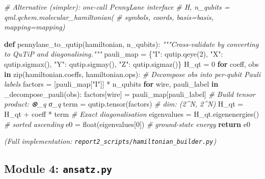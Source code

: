 \documentclass[
  11pt,
]{report}
\newenvironment{Shaded}{}{}
\newcommand{\BuiltInTok}[1]{\textcolor[rgb]{0.00,0.50,0.00}{#1}}
\newcommand{\CommentTok}[1]{\textcolor[rgb]{0.38,0.63,0.69}{\textit{#1}}}
\newcommand{\ControlFlowTok}[1]{\textcolor[rgb]{0.00,0.44,0.13}{\textbf{#1}}}
\newcommand{\DecValTok}[1]{\textcolor[rgb]{0.25,0.63,0.44}{#1}}
\newcommand{\KeywordTok}[1]{\textcolor[rgb]{0.00,0.44,0.13}{\textbf{#1}}}
\newcommand{\NormalTok}[1]{#1}
\newcommand{\OperatorTok}[1]{\textcolor[rgb]{0.40,0.40,0.40}{#1}}
\newcommand{\StringTok}[1]{\textcolor[rgb]{0.25,0.44,0.63}{#1}}
\begin{document}
\begin{Shaded}
\begin{Highlighting}[]
    \CommentTok{\# Alternative (simpler): one{-}call PennyLane interface}
    \CommentTok{\# H, n\_qubits = qml.qchem.molecular\_hamiltonian(}
    \CommentTok{\#     symbols, coords, basis=basis, mapping=mapping)}


\KeywordTok{def}\NormalTok{ pennylane\_to\_qutip(hamiltonian, n\_qubits):}
    \CommentTok{"""Cross{-}validate by converting to QuTiP and diagonalising."""}
\NormalTok{    pauli\_map }\OperatorTok{=}\NormalTok{ \{}\StringTok{"I"}\NormalTok{: qutip.qeye(}\DecValTok{2}\NormalTok{), }\StringTok{"X"}\NormalTok{: qutip.sigmax(),}
                 \StringTok{"Y"}\NormalTok{: qutip.sigmay(), }\StringTok{"Z"}\NormalTok{: qutip.sigmaz()\}}
\NormalTok{    H\_qt }\OperatorTok{=} \DecValTok{0}
    \ControlFlowTok{for}\NormalTok{ coeff, obs }\KeywordTok{in} \BuiltInTok{zip}\NormalTok{(hamiltonian.coeffs, hamiltonian.ops):}
        \CommentTok{\# Decompose obs into per{-}qubit Pauli labels}
\NormalTok{        factors }\OperatorTok{=}\NormalTok{ [pauli\_map[}\StringTok{"I"}\NormalTok{]] }\OperatorTok{*}\NormalTok{ n\_qubits}
        \ControlFlowTok{for}\NormalTok{ wire, pauli\_label }\KeywordTok{in}\NormalTok{ \_decompose\_pauli(obs):}
\NormalTok{            factors[wire] }\OperatorTok{=}\NormalTok{ pauli\_map[pauli\_label]}
        \CommentTok{\# Build tensor product: ⊗\_q σ\_q}
\NormalTok{        term }\OperatorTok{=}\NormalTok{ qutip.tensor(factors)        }\CommentTok{\# dim: (2\^{}N, 2\^{}N)}
\NormalTok{        H\_qt }\OperatorTok{=}\NormalTok{ H\_qt }\OperatorTok{+}\NormalTok{ coeff }\OperatorTok{*}\NormalTok{ term}
    \CommentTok{\# Exact diagonalisation}
\NormalTok{    eigenvalues }\OperatorTok{=}\NormalTok{ H\_qt.eigenenergies()      }\CommentTok{\# sorted ascending}
\NormalTok{    e0 }\OperatorTok{=} \BuiltInTok{float}\NormalTok{(eigenvalues[}\DecValTok{0}\NormalTok{])              }\CommentTok{\# ground{-}state energy}
    \ControlFlowTok{return}\NormalTok{ e0}
\end{Highlighting}
\end{Shaded}

\emph{(Full implementation:
\texttt{report2\_scripts/hamiltonian\_builder.py})}

\subsection{\texorpdfstring{Module 4:
\texttt{ansatz.py}}{Module 4: ansatz.py}}\label{module-4-ansatz.py}
\end{document}
